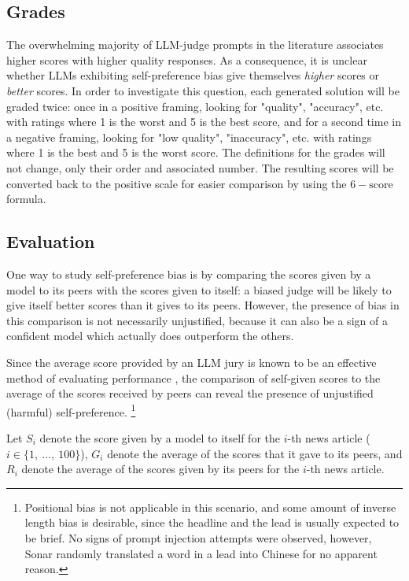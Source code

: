\documentclass[noindent,nohyp,parspace,titlepage,twoside,12pt]{article}
\begin{document}
    \subsection{Grades}

      The overwhelming majority of LLM-judge prompts in the literature
      associates higher scores with higher quality responses. As a consequence,
      it is unclear whether LLMs exhibiting self-preference bias give
      themselves \emph{higher} scores or \emph{better} scores. In order to
      investigate this question, each generated solution will be graded twice:
      once in a positive framing, looking for "quality", "accuracy", etc. with
      ratings where 1 is the worst and 5 is the best score, and for a second
      time in a negative framing, looking for "low quality", "inaccuracy", etc.
      with ratings where 1 is the best and 5 is the worst score. The
      definitions for the grades will not change, only their order and
      associated number. The resulting scores will be converted back to the
      positive scale for easier comparison by using the $6 - \text{score}$
      formula.

    \subsection{Evaluation}

      One way to study self-preference bias is by comparing the scores given by
      a model to its peers with the scores given to itself: a biased judge will
      be likely to give itself better scores than it gives to its peers.
      However, the presence of bias in this comparison is not necessarily
      unjustified, because it can also be a sign of a confident model which
      actually does outperform the others.

      Since the average score provided by an LLM jury is known to be an
      effective method of evaluating performance \cite{juries}, the comparison
      of self-given scores to the average of the scores received by peers can
      reveal the presence of unjustified (harmful) self-preference.
      \footnote{Positional bias is not applicable in this scenario, and some
      amount of inverse length bias is desirable, since the headline and the
      lead is usually expected to be brief. No signs of prompt injection
      attempts were observed, however, Sonar randomly translated a word in a
      lead into Chinese for no apparent reason.}

      Let $S_i$ denote the score given by a model to itself for the $i$-th news
      article ($i \in \{ 1,\ \dots,\ 100 \}$), $G_i$ denote the average of the
      scores that it gave to its peers, and $R_i$ denote the average of the
      scores given by its peers for the $i$-th news article.
\end{document}

